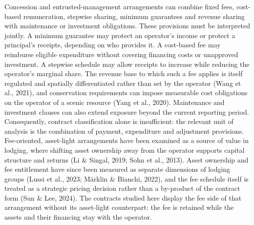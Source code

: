 \documentclass[review,3p,times]{elsarticle}
\begin{document}
Concession and entrusted-management arrangements can combine fixed fees, cost-based remuneration, stepwise sharing, minimum guarantees and revenue sharing with maintenance or investment obligations. These provisions must be interpreted jointly. A minimum guarantee may protect an operator's income or protect a principal's receipts, depending on who provides it. A cost-based fee may reimburse eligible expenditure without covering financing costs or unapproved investment. A stepwise schedule may allow receipts to increase while reducing the operator's marginal share. The revenue base to which such a fee applies is itself regulated and spatially differentiated rather than set by the operator (Wang et al., 2021), and conservation requirements can impose measurable cost obligations on the operator of a scenic resource (Yang et al., 2020). Maintenance and investment clauses can also extend exposure beyond the current reporting period. Consequently, contract classification alone is insufficient: the relevant unit of analysis is the combination of payment, expenditure and adjustment provisions. Fee-oriented, asset-light arrangements have been examined as a source of value in lodging, where shifting asset ownership away from the operator supports capital structure and returns (Li \& Singal, 2019; Sohn et al., 2013). Asset ownership and fee entitlement have since been measured as separate dimensions of lodging groups (Lussi et al., 2023; Märklin \& Bianchi, 2022), and the fee schedule itself is treated as a strategic pricing decision rather than a by-product of the contract form (Sun \& Lee, 2024). The contracts studied here display the fee side of that arrangement without its asset-light counterpart: the fee is retained while the assets and their financing stay with the operator.
\end{document}
